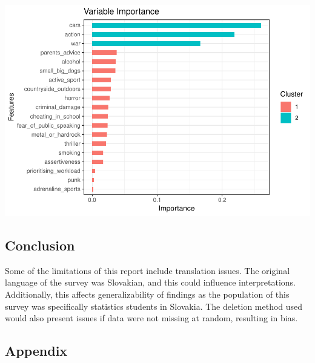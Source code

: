 \documentclass[]{article}
\begin{document}
\includegraphics{final_report_files/figure-latex/unnamed-chunk-14-1.pdf}

\subsection{Conclusion}\label{conclusion}

Some of the limitations of this report include translation issues. The
original language of the survey was Slovakian, and this could influence
interpretations. Additionally, this affects generalizability of findings
as the population of this survey was specifically statistics students in
Slovakia. The deletion method used would also present issues if data
were not missing at random, resulting in bias.

\newpage

\subsection{Appendix}\label{appendix}
\end{document}
